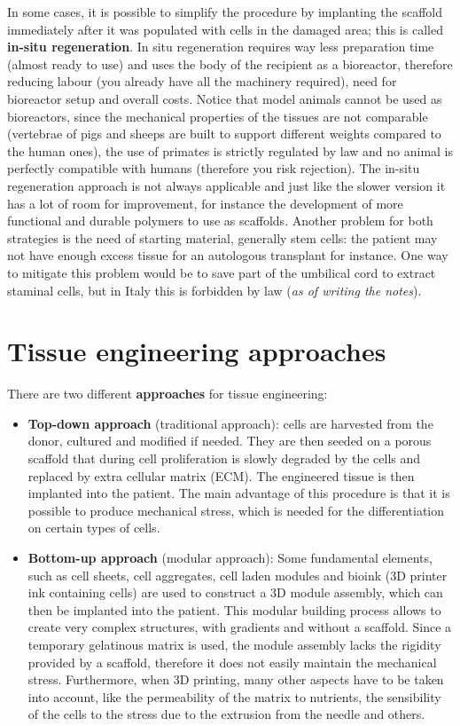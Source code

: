   In some cases, it is possible to simplify the procedure by implanting the scaffold immediately after it was populated with cells in the damaged area; this is called \textbf{in-situ regeneration}.
  In situ regeneration requires way less preparation time (almost ready to use) and uses the body of the recipient as a bioreactor, therefore reducing labour (you already have all the machinery required), need for bioreactor setup and overall costs.
  Notice that model animals cannot be used as bioreactors, since the mechanical properties of the tissues are not comparable (vertebrae of pigs and sheeps are built to support different weights compared to the human ones), the use of primates is strictly regulated by law and no animal is perfectly compatible with humans (therefore you risk rejection).
  The in-situ regeneration approach is not always applicable and just like the slower version it has a lot of room for improvement, for instance the development of more functional and durable polymers to use as scaffolds.
  Another problem for both strategies is the need of starting material, generally stem cells: the patient may not have enough excess tissue for an autologous transplant for instance.
  One way to mitigate this problem would be to save part of the umbilical cord to extract staminal cells, but in Italy this is forbidden by law (\textit{as of writing the notes}).

\section{Tissue engineering approaches}
There are two different \textbf{approaches} for tissue engineering:

\begin{multicols}{2}
  \begin{itemize}
    \item \textbf{Top-down approach} (traditional approach): cells are harvested from the donor, cultured and modified if needed. They are then seeded on a porous scaffold that during cell proliferation is slowly degraded by the cells and replaced by extra cellular matrix (ECM). The engineered tissue is then implanted into the patient. The main advantage of this procedure is that it is possible to produce mechanical stress, which is needed for the differentiation on certain types of cells.
    \item \textbf{Bottom-up approach} (modular approach): Some fundamental elements, such as cell sheets, cell aggregates, cell laden modules and bioink (3D printer ink containing cells) are used to construct a 3D module assembly, which can then be implanted into the patient. This modular building process allows to create very complex structures, with gradients and without a scaffold. Since a temporary gelatinous matrix is used, the module assembly lacks the rigidity provided by a scaffold, therefore it does not easily maintain the mechanical stress. Furthermore, when 3D printing, many other aspects have to be taken into account, like the permeability of the matrix to nutrients, the sensibility of the cells to the stress due to the extrusion from the needle and others.
  \end{itemize}
\end{multicols}
